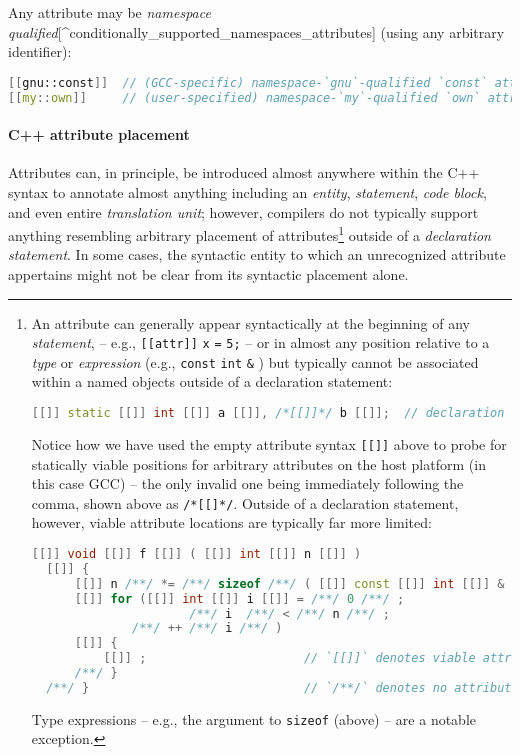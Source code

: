 \documentclass[twoside,10pt,letterpaper,usenames]{newstyle-PearsonGeneric-7-38}
\begin{document}
Any attribute may be \emph{namespace
qualified}{[}\^{}conditionally\_supported\_namespaces\_attributes{]}
(using any arbitrary identifier):

\begin{lstlisting}[language=C++, caption={missing caption}, label={testlabel}, frame=tb]
[[gnu::const]]  // (GCC-specific) namespace-`gnu`-qualified `const` attribute
[[my::own]]     // (user-specified) namespace-`my`-qualified `own` attribute
\end{lstlisting}
    

\paragraph[C++ attribute placement]{C++ attribute placement}\label{c++-attribute-placement}

Attributes can, in principle, be introduced almost anywhere within the
C++ syntax to annotate almost anything including an \emph{entity},
\emph{statement}, \emph{code block}, and even entire \emph{translation
unit}; however, compilers do not typically support anything resembling
arbitrary placement of attributes{\cprotect\footnote{An attribute can
  generally appear syntactically at the beginning of any
  \emph{statement}, -- e.g., \texttt{[[attr]]} \texttt{x} \texttt{=}
  \texttt{5;} -- or in almost any position relative to a \emph{type} or
  \emph{expression} (e.g., \texttt{const} \texttt{int} \texttt{\&} ) but
  typically cannot be associated within a named objects outside of a
  declaration statement:

  \begin{lstlisting}[language=C++, label={testlabel}, basicstyle={\ttfamily\footnotesize}]
  [[]] static [[]] int [[]] a [[]], /*[[]]*/ b [[]];  // declaration statement
  \end{lstlisting}
      

  Notice how we have used the empty attribute syntax \texttt{[[]]} above
  to probe for statically viable positions for arbitrary attributes on
  the host platform (in this case GCC) -- the only invalid one being
  immediately following the comma, shown above as \texttt{/*[[]*/}.
  Outside of a declaration statement, however, viable attribute
  locations are typically far more limited:

  \begin{lstlisting}[language=C++, label={testlabel}, basicstyle={\ttfamily\footnotesize}]
  [[]] void [[]] f [[]] ( [[]] int [[]] n [[]] )
  [[]] {
      [[]] n /**/ *= /**/ sizeof /**/ ( [[]] const [[]] int [[]] & [[]] ) /**/;
      [[]] for ([[]] int [[]] i [[]] = /**/ 0 /**/ ;
                      /**/ i  /**/ < /**/ n /**/ ;
              /**/ ++ /**/ i /**/ )
      [[]] {
          [[]] ;                      // `[[]]` denotes viable attribute location
      /**/ }
  /**/ }                              // `/**/` denotes no attribute is allowed
  \end{lstlisting}
      

  Type expressions -- e.g., the argument to \texttt{sizeof} (above) --
  are a notable exception.}} outside of a \emph{declaration statement}.
In some cases, the syntactic entity to which an unrecognized attribute
appertains might not be clear from its syntactic placement alone.
\end{document}
